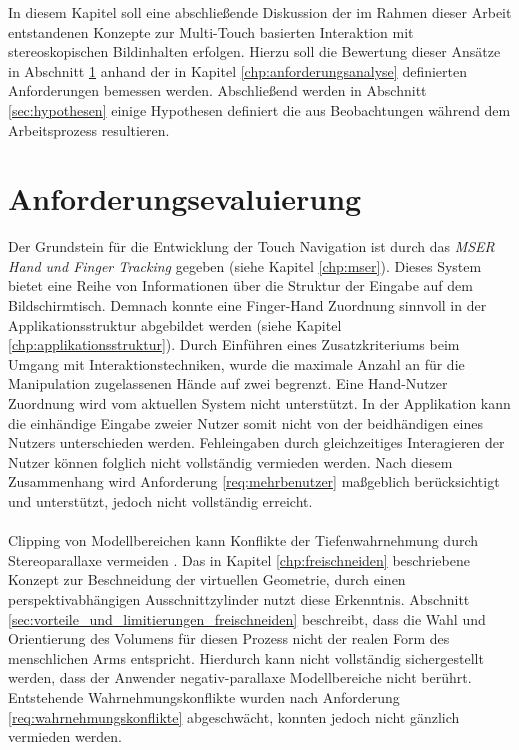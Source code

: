 In diesem Kapitel soll eine abschließende Diskussion der im Rahmen dieser Arbeit entstandenen Konzepte zur Multi-Touch basierten Interaktion mit stereoskopischen Bildinhalten erfolgen. Hierzu soll die Bewertung dieser Ansätze in Abschnitt \ref{sec:anforderungsevaluierung} anhand der in Kapitel \ref{chp:anforderungsanalyse} definierten Anforderungen bemessen werden. Abschließend werden in Abschnitt \ref{sec:hypothesen} einige Hypothesen definiert die aus Beobachtungen während dem Arbeitsprozess resultieren.


\section{Anforderungsevaluierung}
\label{sec:anforderungsevaluierung}

Der Grundstein für die Entwicklung der Touch Navigation ist durch das \emph{MSER Hand und Finger Tracking} gegeben (siehe Kapitel \ref{chp:mser}). Dieses System bietet eine Reihe von Informationen über die Struktur der Eingabe auf dem Bildschirmtisch. Demnach konnte eine Finger-Hand Zuordnung sinnvoll in der Applikationsstruktur abgebildet werden (siehe Kapitel \ref{chp:applikationsstruktur}). Durch Einführen eines Zusatzkriteriums beim Umgang mit Interaktionstechniken, wurde die maximale Anzahl an für die Manipulation zugelassenen Hände auf zwei begrenzt. Eine Hand-Nutzer Zuordnung wird vom aktuellen System nicht unterstützt. In der Applikation kann die einhändige Eingabe zweier Nutzer somit nicht von der beidhändigen eines Nutzers unterschieden werden. Fehleingaben durch gleichzeitiges Interagieren der Nutzer können folglich nicht vollständig vermieden werden. Nach diesem Zusammenhang wird Anforderung \ref{req:mehrbenutzer} maßgeblich berücksichtigt und unterstützt, jedoch nicht vollständig erreicht.
\\\\
Clipping von Modellbereichen kann Konflikte der Tiefenwahrnehmung durch Stereoparallaxe vermeiden \cite{ardouin:2011}. Das in Kapitel \ref{chp:freischneiden} beschriebene Konzept zur Beschneidung der virtuellen Geometrie, durch einen perspektivabhängigen Ausschnittzylinder nutzt diese Erkenntnis. Abschnitt \ref{sec:vorteile_und_limitierungen_freischneiden} beschreibt, dass die Wahl und Orientierung des Volumens für diesen Prozess nicht der realen Form des menschlichen Arms entspricht. Hierdurch kann nicht vollständig sichergestellt werden, dass der Anwender negativ-parallaxe Modellbereiche nicht berührt. Entstehende Wahrnehmungskonflikte wurden nach Anforderung \ref{req:wahrnehmungskonflikte} abgeschwächt, konnten jedoch nicht gänzlich vermieden werden.
